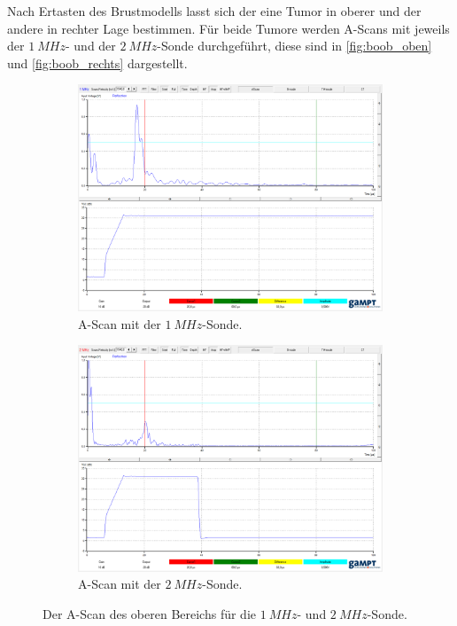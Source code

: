 Nach Ertasten des Brustmodells lasst sich der eine Tumor in oberer und der andere in rechter Lage bestimmen.
Für beide Tumore werden A-Scans mit jeweils der $\qty{1}{MHz}$- und der $\qty{2}{MHz}$-Sonde durchgeführt, 
diese sind in \autoref{fig:boob_oben} und \autoref{fig:boob_rechts} dargestellt.
\begin{figure}
  \centering
  
  \begin{subfigure}{0.49\columnwidth}
  \centering
  \includegraphics[width=\textwidth]{pictures/boob_oben_1MHz.png}
  \caption{A-Scan mit der $\qty{1}{MHz}$-Sonde.}
  \label{fig:boob_oben_1}
  \end{subfigure}
  \hfill
  \begin{subfigure}{0.49\columnwidth}
  \centering
  \includegraphics[width=\textwidth]{pictures/boob_oben_2MHz.png}
  \caption{A-Scan mit der $\qty{2}{MHz}$-Sonde.}
  \label{fig:boob_oben_2}
  \end{subfigure}

  \caption{Der A-Scan des oberen Bereichs für die $\qty{1}{MHz}$- und $\qty{2}{MHz}$-Sonde.}
  \label{fig:boob_oben}
\end{figure}

